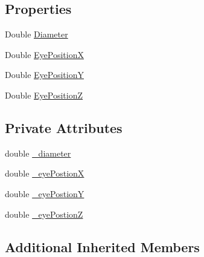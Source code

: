 \subsection*{Properties}
\begin{DoxyCompactItemize}
\item 
Double \hyperlink{class_web_analyzer_1_1_models_1_1_data_model_1_1_eye_tracking_data_a52d26b6d84aa2b1fac4dc11e299b69d9}{Diameter}
\item 
Double \hyperlink{class_web_analyzer_1_1_models_1_1_data_model_1_1_eye_tracking_data_a872295614640947c4599c118311be629}{Eye\+Position\+X}
\item 
Double \hyperlink{class_web_analyzer_1_1_models_1_1_data_model_1_1_eye_tracking_data_a4c90dacc2660f530e239c2dca2dddaea}{Eye\+Position\+Y}
\item 
Double \hyperlink{class_web_analyzer_1_1_models_1_1_data_model_1_1_eye_tracking_data_a37767ef6afd8e74c124fd0683015b4e5}{Eye\+Position\+Z}
\end{DoxyCompactItemize}
\subsection*{Private Attributes}
\begin{DoxyCompactItemize}
\item 
double \hyperlink{class_web_analyzer_1_1_models_1_1_data_model_1_1_eye_tracking_data_a3cdac1c3e4271e126c3310dc4e61ab0b}{\+\_\+diameter}
\item 
double \hyperlink{class_web_analyzer_1_1_models_1_1_data_model_1_1_eye_tracking_data_af659819843df096a6d7cb0a1529dff17}{\+\_\+eye\+Postion\+X}
\item 
double \hyperlink{class_web_analyzer_1_1_models_1_1_data_model_1_1_eye_tracking_data_a6cd742d66dfc6b47af922538b8b9aed1}{\+\_\+eye\+Postion\+Y}
\item 
double \hyperlink{class_web_analyzer_1_1_models_1_1_data_model_1_1_eye_tracking_data_add61d5594941d08aa4e1a8d2b8912690}{\+\_\+eye\+Postion\+Z}
\end{DoxyCompactItemize}
\subsection*{Additional Inherited Members}


